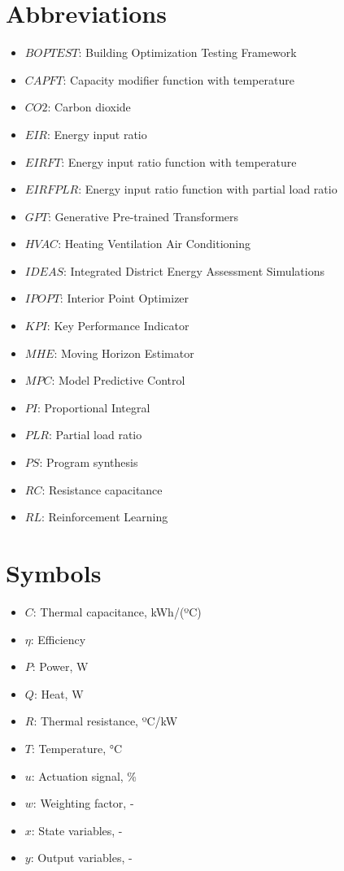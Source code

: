 \section{Abbreviations}
\renewcommand{\labelitemi}{}
\begin{itemize}
    \item{$BOPTEST$: Building Optimization Testing Framework}
    \item{$CAPFT$: Capacity modifier function with temperature}
    \item{$CO2$: Carbon dioxide}
    \item{$EIR$: Energy input ratio}
    \item{$EIRFT$: Energy input ratio function with temperature}
    \item{$EIRFPLR$: Energy input ratio function with partial load ratio}
    \item{$GPT$: Generative Pre-trained Transformers}
    \item{$HVAC$: Heating Ventilation Air Conditioning}
    \item{$IDEAS$: Integrated District Energy Assessment Simulations}
    \item{$IPOPT$: Interior Point Optimizer}
    \item{$KPI$: Key Performance Indicator}
    \item{$MHE$: Moving Horizon Estimator}
    \item{$MPC$: Model Predictive Control}
    \item{$PI$: Proportional Integral}
    \item{$PLR$: Partial load ratio}
    \item{$PS$: Program synthesis}
    \item{$RC$: Resistance capacitance}
    \item{$RL$: Reinforcement Learning}
\end{itemize}

 

\section{Symbols}

\begin{itemize}
    \item{$C$: Thermal capacitance, kWh/(ºC)}
    \item{$\eta$: Efficiency}
    \item{$P$: Power, W}
    \item{$Q$: Heat, W}
    \item{$R$: Thermal resistance, ºC/kW}
    \item{$T$: Temperature, °C}
    \item{$u$: Actuation signal, \%}
    \item{$w$: Weighting factor, -}
    \item{$x$: State variables, -}
    \item{$y$: Output variables, -}
\end{itemize}


